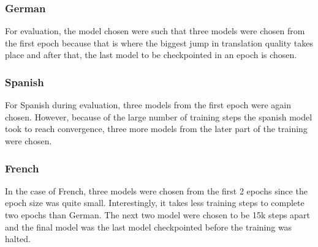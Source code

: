 \documentclass[12pt,a4paper,twoside,openright]{report}
\begin{document}
\subsubsection{German}
For evaluation, the model chosen were such that three models were chosen from the first epoch because that is where the biggest jump in translation quality takes place and after that, the last model to be checkpointed in an epoch is chosen. 

\subsubsection{Spanish}
For Spanish during evaluation, three models from the first epoch were again chosen. However, because of the large number of training steps the spanish model took to reach convergence, three more models from the later part of the training were chosen. 

\subsubsection{French}
In the case of French, three models were chosen from the first 2 epochs since the epoch size was quite small. Interestingly, it takes less training steps to complete two epochs than German. The next two model were chosen to be 15k steps apart and the final model was the last model checkpointed before the training was halted. 
\end{document}
